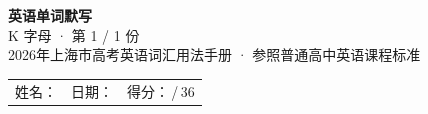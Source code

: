 \documentclass[10pt,a4paper]{article}
\begin{document}
\pagestyle{plain}

\begin{center}
{\LARGE\bfseries 英语单词默写}\\[0.22em]
{\large K 字母 · 第 1 / 1 份}\\[0.18em]
{\small 2026年上海市高考英语词汇用法手册 · 参照普通高中英语课程标准}
\end{center}

\vspace{0.25em}
\noindent\begin{tabular}{@{}p{}@{}p{}@{}p{}@{}}
姓名：\underline{\hspace{2.0cm}} & 日期：\underline{\hspace{2.0cm}} & 得分：\underline{\hspace{1.3cm}}\,/\,36 \\
\end{tabular}

\vspace{0.3em}

\vspace{0.08em}
\end{document}
